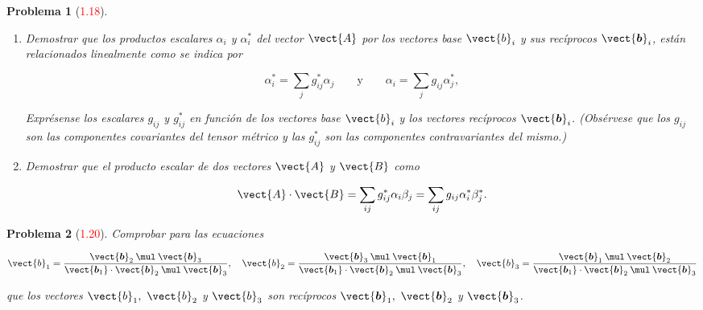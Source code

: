 \documentclass[12pt]{article}
\theoremstyle{break}
\newtheorem{exercise}{Problema}
\theoremstyle{nonumberbreak}
\newcommand*{\dotprod}[2]{#1 \mathbin{\cdot} #2\xspace}
\newcommand*{\crossprod}[2]{#1 \mathbin{\mul} #2\xspace}
\begin{document}
    \begin{exercise}[\textcolor{red}{1.18}]
      \begin{enumerate}[label = \alph*)]
        \item Demostrar que los productos escalares \(\alpha_{i}\) y \(\alpha_{i}^{*}\) del vector \(\vect{A}\) por los vectores base \(\vect{b}_{i}\) y sus recíprocos \(\vect{\bm{b}}_{i}\), están relacionados linealmente como se indica por
        
        \begin{equation*}
          \alpha_{i}^{*} = \sum_{j}g_{ij}^{*}\alpha_{j}\qquad \text{y}\qquad \alpha_{i} = \sum_{j}g_{ij}\alpha_{j}^{*},
        \end{equation*}

        Exprésense los escalares \(g_{ij}\) y \(g_{ij}^{*}\) en función de los vectores base \(\vect{b}_{i}\) y los vectores recíprocos \(\vect{\bm{b}}_{i}\). (Obsérvese que los \(g_{ij}\) son las componentes covariantes del tensor métrico y las \(g_{ij}^{*}\) son las componentes contravariantes del mismo.)

        \item Demostrar que el producto escalar de dos vectores \(\vect{A}\) y \(\vect{B}\) como
        
        \begin{equation*}
          \dotprod{\vect{A}}{\vect{B}} = \sum_{ij}g_{ij}^{*}\alpha_{i}\beta_{j} = \sum_{ij}g_{ij}\alpha_{i}^{*}\beta_{j}^{*}.
        \end{equation*}
      \end{enumerate}
    \end{exercise}
    
    \begin{exercise}[\textcolor{red}{1.20}]
      Comprobar para las ecuaciones

      \begin{equation*}
        \vect{b}_{1} = \dfrac{\crossprod{\vect{\bm{b}}_{2}}{\vect{\bm{b}}_{3}}}{\dotprod{\vect{\bm{b}_{1}}}{\crossprod{\vect{\bm{b}}_{2}}{\vect{\bm{b}}_{3}}}},\quad
        \vect{b}_{2} = \dfrac{\crossprod{\vect{\bm{b}}_{3}}{\vect{\bm{b}}_{1}}}{\dotprod{\vect{\bm{b}_{1}}}{\crossprod{\vect{\bm{b}}_{2}}{\vect{\bm{b}}_{3}}}},
        \quad
        \vect{b}_{3} = \dfrac{\crossprod{\vect{\bm{b}}_{1}}{\vect{\bm{b}}_{2}}}{\dotprod{\vect{\bm{b}_{1}}}{\crossprod{\vect{\bm{b}}_{2}}{\vect{\bm{b}}_{3}}}}
      \end{equation*}

      que los vectores \(\vect{b}_{1},\ \vect{b}_{2}\) y \(\vect{b}_{3}\) son recíprocos \(\vect{\bm{b}}_{1},\ \vect{\bm{b}}_{2}\) y \(\vect{\bm{b}}_{3}\).
    \end{exercise}
    
\end{document}
